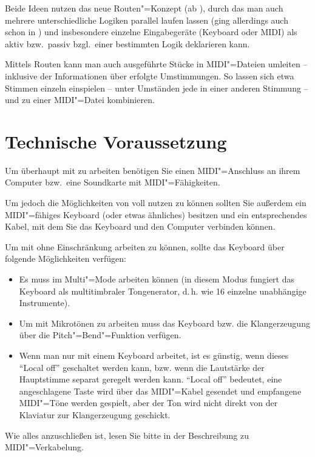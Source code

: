 Beide Ideen nutzen das neue Routen"=Konzept (ab \mutabor[~3]), 
durch das man auch mehrere unterschiedliche Logiken parallel 
laufen lassen (ging allerdings auch schon in \mutabor[~II]) 
und insbesondere einzelne Eingabegeräte (Keyboard oder MIDI) 
als aktiv bzw.\ passiv bzgl.\ einer bestimmten Logik deklarieren 
kann. 

Mittels Routen kann man auch ausgeführte Stücke in MIDI"=Dateien
umleiten -- inklusive der Informationen über erfolgte Umstimmungen.
So lassen sich etwa Stimmen einzeln einspielen -- unter Umständen jede
in einer anderen Stimmung -- und zu einer MIDI"=Datei kombinieren.


\section{Technische Voraussetzung}

Um überhaupt mit \mutabor{} zu arbeiten benötigen Sie einen
MIDI"=Anschluss an ihrem Computer bzw.\ eine Soundkarte mit
MIDI"=Fähigkeiten.

Um jedoch die Möglichkeiten von \mutabor{} voll nutzen zu 
können sollten Sie außerdem ein MIDI"=fähiges Keyboard (oder 
etwas ähnliches) besitzen und ein entsprechendes Kabel, mit 
dem Sie das Keyboard und den Computer verbinden können.

Um mit \mutabor{} ohne Einschränkung arbeiten zu können, 
sollte das Keyboard über folgende Möglichkeiten verfügen:

\begin{itemize}
\item Es muss im Multi"=Mode arbeiten können (in diesem Modus fungiert
  das Keyboard als multitimbraler Tongenerator, d.\,h. wie 16 einzelne
  unabhängige Instrumente).
\item Um mit Mikrotönen zu arbeiten muss das Keyboard bzw. die
  Klangerzeugung über die Pitch"=Bend"=Funktion verfügen.
\item Wenn man nur mit einem Keyboard arbeitet, ist es günstig, wenn
  dieses "`Local off"' geschaltet werden kann, bzw. wenn die
  Lautstärke der Hauptstimme separat geregelt werden kann. "`Local
  off"' bedeutet, eine angeschlagene Taste wird über das MIDI"=Kabel
  gesendet und empfangene MIDI"=Töne werden gespielt, aber der Ton
  wird nicht direkt von der Klaviatur zur Klangerzeugung geschickt.
\end{itemize}

Wie alles anzuschließen ist, lesen Sie bitte in der Beschreibung 
zu MIDI"=Verkabelung.




